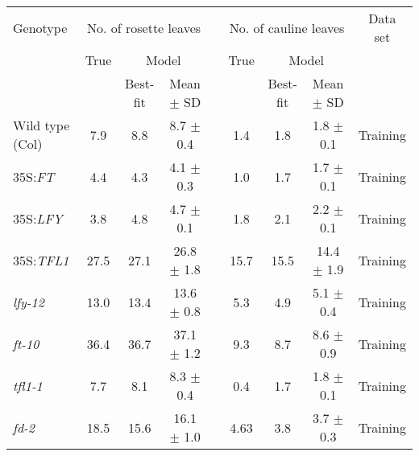 \begin{table*}[!htb]
\centering
    \begin{tabular}{@{}l@{\hspace{0.8em}}ccc@{\hspace{0.5em}}c@{\hspace{1.4em}}c@{\hspace{0.7em}}c@{\hspace{0.7em}}cc@{}}
      \toprule
      Genotype  & \multicolumn{3}{c}{ No. of rosette leaves} && \multicolumn{3}{c}{ No. of cauline leaves} & Data set \\
\cmidrule(){2-4} \cmidrule(){6-8}
& True & \multicolumn{2}{c}{Model} && True & \multicolumn{2}{c}{Model} & \\
\cmidrule(){3-4} \cmidrule(){7-8}
& & Best-fit & Mean $\pm$ SD &&& Best-fit & Mean $\pm$ SD \\
      \toprule
      Wild type (Col)             & 7.9   & 8.8  &  8.7  $ \pm $  0.4  && 1.4  & 1.8  &  1.8 $ \pm $ 0.1   &  Training\\ 
      35S:\emph{FT}               & 4.4   & 4.3  &  4.1  $ \pm $  0.3  && 1.0  & 1.7  &  1.7 $ \pm $ 0.1   &  Training\\ 
      35S:\emph{LFY}              & 3.8   & 4.8  &  4.7  $ \pm $  0.1  && 1.8  & 2.1  &  2.2 $ \pm $ 0.1   &  Training\\ 
      35S:\emph{TFL1}             & 27.5  & 27.1 & 26.8  $ \pm $  1.8  && 15.7 & 15.5 & 14.4 $ \pm $ 1.9   &  Training\\ 
      \emph{lfy-12}               & 13.0  & 13.4 & 13.6  $ \pm $  0.8  && 5.3  & 4.9  &  5.1 $ \pm $ 0.4   &  Training\\ 
      \emph{ft-10}                & 36.4  & 36.7 & 37.1  $ \pm $  1.2  && 9.3  & 8.7  &  8.6 $ \pm $ 0.9   &  Training\\ 
      \emph{tfl1-1}               & 7.7   & 8.1  &  8.3  $ \pm $  0.4  && 0.4  & 1.7  &  1.8 $ \pm $ 0.1   &  Training\\ 
      \emph{fd-2}                 & 18.5  & 15.6 & 16.1  $ \pm $  1.0  && 4.63 & 3.8  &  3.7 $ \pm $ 0.3   &  Training\\ 

\end{tabular}
\end{table*}
